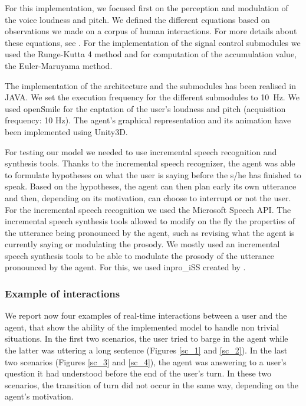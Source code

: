 For this implementation, we focused first on the perception and modulation of the voice loudness and pitch. We defined the different equations based on observations we made on a corpus of human interactions. For more details about these equations, see \cite{jegou_continuous_2015}. For the implementation of the signal control submodules we used the Runge-Kutta 4 method and for computation of the accumulation value, the Euler-Maruyama method. 

The implementation of the architecture and the submodules has been realised in JAVA. We set the execution frequency for the different submodules to 10~Hz. 
We used openSmile \citep{eyben_recent_2013} for the captation of the user's loudness and pitch (acquisition frequency: 10 Hz). %
The agent's graphical representation and its animation have been implemented using Unity3D. 

For testing our model we needed to use incremental speech recognition and synthesis tools. Thanks to the incremental speech recognizer, the agent was able to formulate hypotheses on what the user is saying before the s/he has finished to speak. Based on the hypotheses, the agent can then plan early its own utterance and then, depending on its motivation, can choose to interrupt or not the user. For the incremental speech recognition we used the Microsoft Speech API. 
The incremental speech synthesis tools allowed to modify on the fly the properties of the utterance being pronounced by the agent, such as revising what the agent is currently saying or modulating the prosody. We mostly used an incremental speech synthesis tools to be able to modulate the prosody of the utterance pronounced by the agent. For this, we used inpro\_iSS created by \cite{baumann_inpro_2012}. 

\subsubsection{Example of interactions}

We report now four examples of real-time interactions between a user and the agent, that show the ability of the implemented model to handle non trivial situations. In the first two scenarios, the user tried to barge in the agent while the latter was uttering a long sentence (Figures \ref{sc_1} and \ref{sc_2}). In the last two scenarios (Figures \ref{sc_3} and \ref{sc_4}), the agent was answering to a user's question it had understood before the end of the user's turn. In these two scenarios, the transition of turn did not occur in the same way, depending on the agent's motivation. 
 
